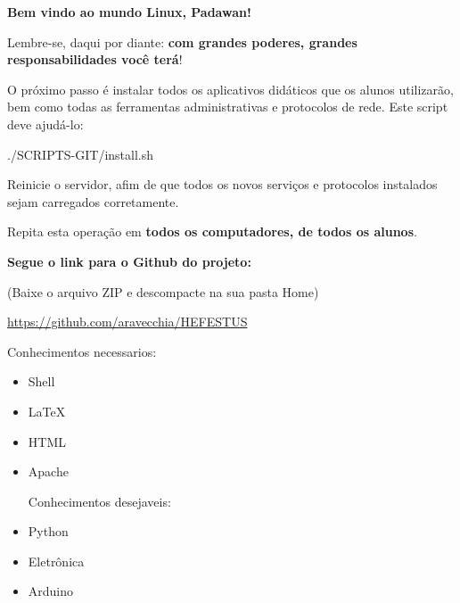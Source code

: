 \begin{multicols}{2}
\textbf{Bem vindo ao mundo Linux, Padawan!}
	
Lembre-se, daqui por diante: \textbf{com grandes poderes, grandes responsabilidades você terá}!
	
	O próximo passo é instalar todos os aplicativos didáticos que os alunos utilizarão, bem como todas as ferramentas administrativas e protocolos de rede. Este script deve ajudá-lo:
	
	
{./SCRIPTS-GIT/install.sh}
	
	Reinicie o servidor, afim de que todos os novos serviços e protocolos instalados sejam carregados corretamente.
	
	Repita esta operação em \textbf{todos os computadores, de todos os alunos}.
	
\textbf{\Large Segue o link para o Github do projeto:}

(Baixe o arquivo ZIP e descompacte na sua pasta Home)
\end{multicols}

\begin{center}
	\Huge	\href{https://github.com/aravecchia/HEFESTUS}{https://github.com/aravecchia/HEFESTUS}
\end{center}

\vfill\null

\pagebreak

\begin{multicols}{2}
\Large Conhecimentos necessarios:
%


	\large
	\begin{itemize}
		\item Shell
		\item \LaTeX
		\item HTML
		\item Apache
		
		\vfill \null
		\columnbreak
		
		\Large Conhecimentos desejaveis:
		
		\item Python
		\item Eletrônica
		\item Arduino
	\end{itemize}
	
\end{multicols}
	\vfill \null
	\pagebreak

